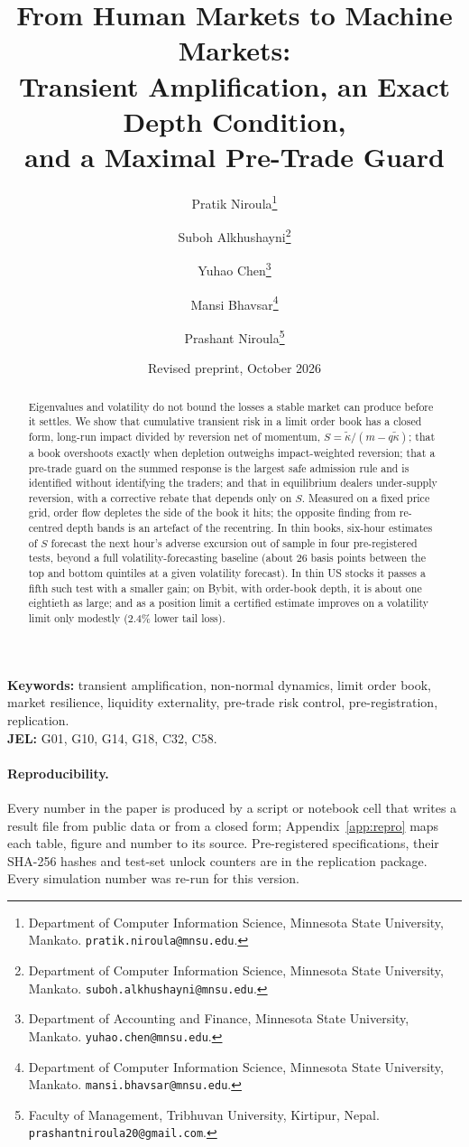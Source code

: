 \documentclass[12pt]{article}
\title{From Human Markets to Machine Markets:\\
Transient Amplification, an Exact Depth Condition,\\ and a Maximal Pre-Trade Guard}
\author{Pratik Niroula\thanks{Department of Computer Information Science, Minnesota State University, Mankato. \texttt{pratik.niroula@mnsu.edu}.}
\and Suboh Alkhushayni\thanks{Department of Computer Information Science, Minnesota State University, Mankato. \texttt{suboh.alkhushayni@mnsu.edu}.}
\and Yuhao Chen\thanks{Department of Accounting and Finance, Minnesota State University, Mankato. \texttt{yuhao.chen@mnsu.edu}.}
\and Mansi Bhavsar\thanks{Department of Computer Information Science, Minnesota State University, Mankato. \texttt{mansi.bhavsar@mnsu.edu}.}
\and Prashant Niroula\thanks{Faculty of Management, Tribhuvan University, Kirtipur, Nepal. \texttt{prashantniroula20@gmail.com}.}}
\date{Revised preprint, October 2026}
\theoremstyle{definition}
\theoremstyle{remark}
\begin{document}
\maketitle
\thispagestyle{empty}

\begin{abstract}
\noindent Eigenvalues and volatility do not bound the losses a stable market can produce before it settles. We show that cumulative transient risk in a limit order book has a closed form, long-run impact divided by reversion net of momentum, $S=\tilde\kappa/(m-q\tilde\kappa)$; that a book overshoots exactly when depletion outweighs impact-weighted reversion; that a pre-trade guard on the summed response is the largest safe admission rule and is identified without identifying the traders; and that in equilibrium dealers under-supply reversion, with a corrective rebate that depends only on $S$. Measured on a fixed price grid, order flow depletes the side of the book it hits; the opposite finding from re-centred depth bands is an artefact of the recentring. In thin books, six-hour estimates of $S$ forecast the next hour's adverse excursion out of sample in four pre-registered tests, beyond a full volatility-forecasting baseline (about 26 basis points between the top and bottom quintiles at a given volatility forecast). In thin US stocks it passes a fifth such test with a smaller gain; on Bybit, with order-book depth, it is about one eightieth as large; and as a position limit a certified estimate improves on a volatility limit only modestly (2.4\% lower tail loss).
\end{abstract}

\noindent\textbf{Keywords:} transient amplification, non-normal dynamics, limit order book, market resilience, liquidity externality, pre-trade risk control, pre-registration, replication.\\
\textbf{JEL:} G01, G10, G14, G18, C32, C58.

\paragraph{Reproducibility.} Every number in the paper is produced by a script or notebook cell that writes a result file from public data or from a closed form; Appendix~\ref{app:repro} maps each table, figure and number to its source. Pre-registered specifications, their SHA-256 hashes and test-set unlock counters are in the replication package. Every simulation number was re-run for this version.

\newpage
\setcounter{page}{1}
\tableofcontents
\newpage
\end{document}
